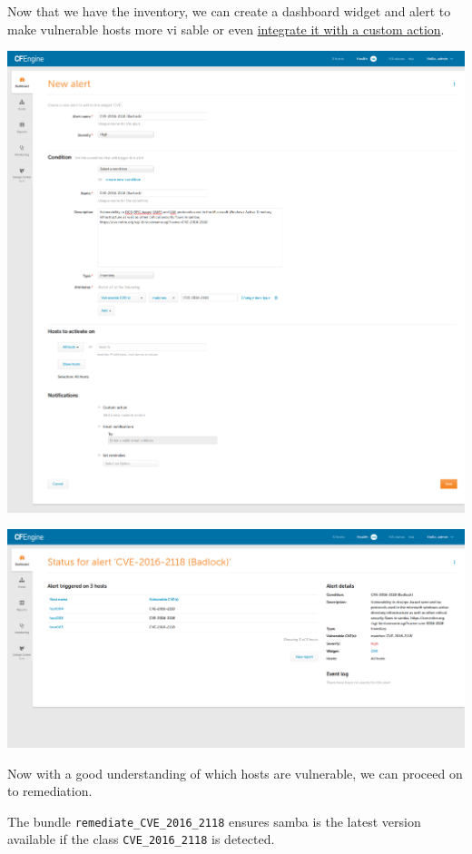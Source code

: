 \documentclass[11pt]{article}
\begin{document}
Now that we have the inventory, we can create a dashboard widget and alert to
make vulnerable hosts more vi sable or even \href{https://cfengine.com/learn/ticketing-system-integration-jira/}{integrate it with a custom action}.

\includegraphics[width=.9\linewidth]{../media/define_alert.png}

\includegraphics[width=.9\linewidth]{../media/alert_status_vulnerable_hosts.png}

Now with a good understanding of which hosts are vulnerable, we can proceed on
to remediation.

The bundle \texttt{remediate\_CVE\_2016\_2118} ensures samba is the latest version
available if the class \texttt{CVE\_2016\_2118} is detected.
\end{document}
